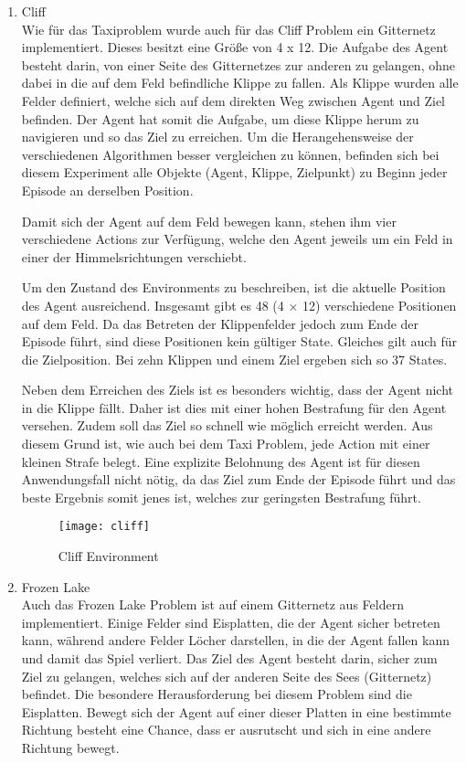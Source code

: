 \begin{enumerate}
    \newpage
    
    \item Cliff\\
    Wie für das Taxiproblem wurde auch für das Cliff Problem \cite{faramaGymnasiumDocumentation} ein Gitternetz implementiert. Dieses besitzt eine Größe von 4 x 12. Die Aufgabe des Agent besteht darin, von einer Seite des Gitternetzes zur anderen zu gelangen, ohne dabei in die auf dem Feld befindliche Klippe zu fallen. Als Klippe wurden alle Felder definiert, welche sich auf dem direkten Weg zwischen Agent und Ziel befinden. Der Agent hat somit die Aufgabe, um diese Klippe herum zu navigieren und so das Ziel zu erreichen. Um die Herangehensweise der verschiedenen Algorithmen besser vergleichen zu können, befinden sich bei diesem Experiment alle Objekte (Agent, Klippe, Zielpunkt) zu Beginn jeder Episode an derselben Position.

    Damit sich der Agent auf dem Feld bewegen kann, stehen ihm vier verschiedene Actions zur Verfügung, welche den Agent jeweils um ein Feld in einer der Himmelsrichtungen verschiebt.

    Um den Zustand des Environments zu beschreiben, ist die aktuelle Position des Agent ausreichend. Insgesamt gibt es 48 (4 × 12) verschiedene Positionen auf dem Feld. Da das Betreten der Klippenfelder jedoch zum Ende der Episode führt, sind diese Positionen kein gültiger State. Gleiches gilt auch für die Zielposition. Bei zehn Klippen und einem Ziel ergeben sich so 37 States.

    Neben dem Erreichen des Ziels ist es besonders wichtig, dass der Agent nicht in die Klippe fällt. Daher ist dies mit einer hohen Bestrafung für den Agent versehen. Zudem soll das Ziel so schnell wie möglich erreicht werden. Aus diesem Grund ist, wie auch bei dem Taxi Problem, jede Action mit einer kleinen Strafe belegt. Eine explizite Belohnung des Agent ist für diesen Anwendungsfall nicht nötig, da das Ziel zum Ende der Episode führt und das beste Ergebnis somit jenes ist, welches zur geringsten Bestrafung führt.

    \begin{figure}[H]
        \centering
        \texttt{[image: cliff]}
        \caption{Cliff Environment}
        \label{fig:cliff_env}
    \end{figure}
    
    \item Frozen Lake\\
    Auch das Frozen Lake Problem \cite{faramaGymnasiumDocumentation} ist auf einem Gitternetz aus Feldern implementiert. Einige Felder sind Eisplatten, die der Agent sicher betreten kann, während andere Felder Löcher darstellen, in die der Agent fallen kann und damit das Spiel verliert. Das Ziel des Agent besteht darin, sicher zum Ziel zu gelangen, welches sich auf der anderen Seite des Sees (Gitternetz) befindet. Die besondere Herausforderung bei diesem Problem sind die Eisplatten. Bewegt sich der Agent auf einer dieser Platten in eine bestimmte Richtung besteht eine Chance, dass er ausrutscht und sich in eine andere Richtung bewegt.


\end{enumerate}
